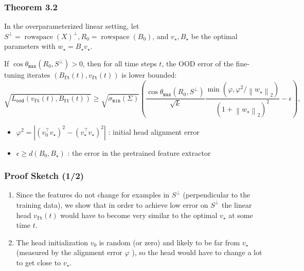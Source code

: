 \documentclass[16pt,aspectratio=169]{beamer}
\begin{document}
\begin{frame}
    \frametitle{Theorem 3.2}

    In the overparameterized linear setting, let $S^{\perp}= \operatorname{rowspace} (X)^{\perp}, R_0= \operatorname{rowspace} \left(B_0\right)$, and $v_{\star}, B_{\star}$ be the optimal parameters with $w_{\star}=B_{\star} v_{\star}$. 

    If $\cos \theta_{\mathtt{max}}\left(R_0, S^{\perp}\right)>0$, then for all time steps $t$, the OOD error of the fine-tuning iterates $\left(B_{\mathtt{ft}}(t), v_{\mathtt{ft}}(t)\right)$ is lower bounded:
    \begin{equation}
        \sqrt{L_{\mathtt{ood}}\left(v_{\mathtt{ft}}(t), B_{\mathtt{ft}}(t)\right)} \geq \sqrt{\sigma_{\mathtt{min}}(\Sigma)}\left(\frac{\cos \theta_{\mathtt{max}}\left(R_0, S^{\perp}\right)}{\sqrt{k}} \frac{\min \left(\varphi, \varphi^2 /\left\|w_{\star}\right\|_2\right)}{\left(1+\left\|w_{\star}\right\|_2\right)^2}-\epsilon\right),
    \end{equation}

    \begin{itemize}
        \item $\varphi^2=\left|\left(v_0^{\top} v_{\star}\right)^2-\left(v_{\star}^{\top} v_{\star}\right)^2\right|$ : initial head alignment error
        \item $\epsilon \geq d\left(B_0, B_{\star}\right)$ : the error in the pretrained feature extractor
    \end{itemize}

\end{frame}

\begin{frame}
    \frametitle{Proof Sketch (1/2)}

    \begin{enumerate}
        \item Since the features do not change for examples in $S^{\perp}$ (perpendicular to the training data), we show that in order to achieve low error on $S^{\perp}$ the linear head $v_{\mathtt{ft}}(t)$ would have to become very similar to the optimal $v_{\star}$ at some time $t$.
        \item The head initialization $v_0$ is random (or zero) and likely to be far from $v_{\star}$ (measured by the alignment error $\varphi$ ), so the head would have to change a lot to get close to $v_{\star}$.
    \end{enumerate}

\end{frame}
\end{document}
